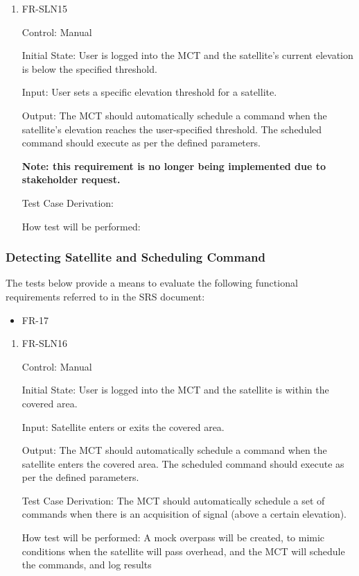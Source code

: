 \documentclass[12pt, titlepage]{article}
\begin{document}
\begin{enumerate}

\item{FR-SLN15\\}

Control: Manual
					
Initial State: User is logged into the MCT and the satellite's current elevation is below the specified threshold.
	
Input: User sets a specific elevation threshold for a satellite.
					
Output: The MCT should automatically schedule a command when the satellite's elevation reaches the user-specified threshold. The scheduled command should execute as per the defined parameters.

\textbf{Note: this requirement is no longer being implemented due to stakeholder request.}

Test Case Derivation:
					
How test will be performed:

\end{enumerate}

\subsubsection{Detecting Satellite and Scheduling Command}

The tests below provide a means to evaluate the following functional requirements referred to in the SRS document:
\begin{itemize}
    \item FR-17
\end{itemize}

\begin{enumerate}

\item{FR-SLN16\\}

Control: Manual
					
Initial State: User is logged into the MCT and the satellite is within the covered area.
	
Input: Satellite enters or exits the covered area.
					
Output: The MCT should automatically schedule a command when the satellite enters the covered area. The scheduled command should execute as per the defined parameters.

Test Case Derivation: The MCT should automatically schedule a set
of commands when there is an acquisition of signal (above a certain elevation).


How test will be performed: A mock overpass will be created, to mimic conditions when the satellite will pass overhead, and the MCT will schedule the commands, and log results

\end{enumerate}
\end{document}
